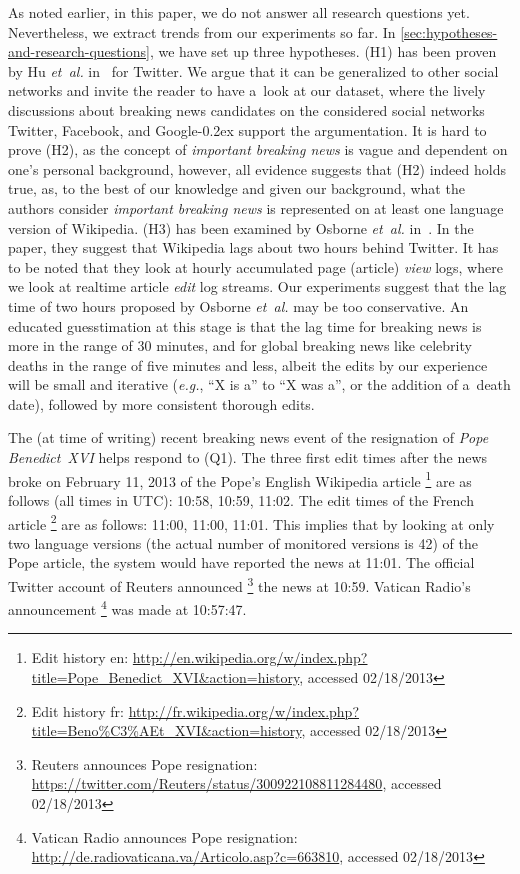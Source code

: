 \documentclass{www13-companion-accepted}
\DeclareRobustCommand{\googleplus}{\mbox{Google\hspace{0em}\raisebox{.28ex}{\tiny\bf +}\kern-0.2ex}\xspace}
\newcommand{\inlinelistingsize}{\fontsize{8pt}{11pt}}
\let\oldurl\url
\renewcommand{\url}[1]{\inlinelistingsize\oldurl{#1}}
\begin{document}
As noted earlier, in this paper,
we do not answer all research questions yet.
Nevertheless, we extract trends from our experiments so far.
In \autoref{sec:hypotheses-and-research-questions},
we have set up three hypotheses.
(H1) has been proven by Hu \emph{et~al.} in~\cite{hu2012breakingnews} for Twitter.
We argue that it can be generalized to other social networks
and invite the reader to have a~look at our dataset,
where the lively discussions about breaking news candidates
on the considered social networks Twitter, Facebook, and \googleplus
support the argumentation.
It is hard to prove (H2), as the concept of \emph{important breaking news}
is vague and dependent on one's personal background, however,
all evidence suggests that (H2) indeed holds true,
as, to the best of our knowledge and given our background,
what the authors consider \emph{important breaking news}
is represented on at least one language version of Wikipedia.
(H3) has been examined by Osborne \emph{et~al.} in~\cite{osborne2012bieber}.
In the paper, they suggest that Wikipedia lags about two hours behind Twitter.
It has to be noted that they look at hourly accumulated page (article) \emph{view} logs,
where we look at realtime article \emph{edit} log streams.
Our experiments suggest that the lag time of two hours
proposed by Osborne \emph{et~al.} may be too conservative.
An educated guesstimation at this stage is that the lag time
for breaking news is more in the range of 30 minutes,
and for global breaking news like celebrity deaths
in the range of five minutes and less,
albeit the edits by our experience will be small and iterative
(\emph{e.g.}, ``X is a'' to ``X was a'', or the addition of a~death date),
followed by more consistent thorough edits.

The (at time of writing) recent breaking news event
of the resignation of \emph{Pope Benedict~XVI} helps respond to (Q1).
The three first edit times after the news broke on February 11, 2013
of the Pope's English Wikipedia article%
\footnote{Edit history en: \url{http://en.wikipedia.org/w/index.php?title=Pope_Benedict_XVI&action=history},
accessed 02/18/2013}
are as follows
(all times in UTC): 10:58, 10:59, 11:02.
The edit times of the French article%
\footnote{Edit history fr: \url{http://fr.wikipedia.org/w/index.php?title=Beno\%C3\%AEt_XVI&action=history}, accessed 02/18/2013}
are as follows: 11:00, 11:00, 11:01.
This implies that by looking at only two language versions
(the actual number of monitored versions is 42) of the Pope article,
the system would have reported the news at 11:01.
The official Twitter account of Reuters announced%
\footnote{Reuters announces Pope resignation: \url{https://twitter.com/Reuters/status/300922108811284480},
accessed 02/18/2013} the news at 10:59.
Vatican Radio's announcement%
\footnote{Vatican Radio announces Pope resignation: \url{http://de.radiovaticana.va/Articolo.asp?c=663810},
accessed 02/18/2013} was made at 10:57:47.
\end{document}
